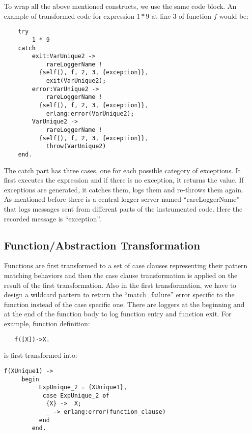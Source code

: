 \documentclass[12pt,a4paper]{report}
\begin{document}
To wrap all the above mentioned constructs, we use the same code block. An example of transformed code for expression $1 * 9$  at line $3$ of function $f$ would be:
 
\begin{lstlisting}
    try 
        1 * 9 
    catch
        exit:VarUnique2 ->
            rareLoggerName ! 
	      {self(), f, 2, 3, {exception}},
            exit(VarUnique2);
        error:VarUnique2 ->
            rareLoggerName ! 
	      {self(), f, 2, 3, {exception}},
            erlang:error(VarUnique2);
        VarUnique2 ->
            rareLoggerName !
	      {self(), f, 2, 3, {exception}},
            throw(VarUnique2)
    end.
\end{lstlisting}

The catch part has three cases, one for each possible category of exceptions. It first executes the expression and if there is no exception, it returns the value. If exceptions are generated, it catches them, logs them and re-throws them again. As mentioned before there is a central logger server named ``rareLoggerName'' that logs messages sent from different parts of the instrumented code. Here the recorded message is ``exception''. 

\subsection{Function/Abstraction Transformation}
Functions are first transformed to a set of case clauses representing their pattern matching behaviors and then the case clause transformation is applied on the result of the first transformation. Also in the first transformation, we have to design a wildcard pattern to return the ``match\_failure'' error specific to the function instead of the case specific one. There are loggers at the beginning and at the end of the function body to log function entry and function exit. For example, function definition:

\begin{lstlisting}
   f([X])->X.
\end{lstlisting}

is first transformed into:

\begin{lstlisting}
f(XUnique1) ->
     begin
          ExpUnique_2 = {XUnique1},
           case ExpUnique_2 of
            {X} ->  X;
            _ -> erlang:error(function_clause)
          end
        end.
\end{lstlisting}
\end{document}
